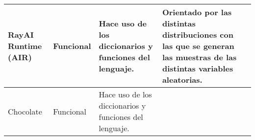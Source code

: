 \begin{longtable}{  p{2.15cm}  p{2.4cm}  p{4.75cm}  p{4.65cm}  p{5.45cm} }
    RayAI Runtime (AIR)                                                                                                                                                                                                                                                                                                          &
    Funcional                                                                                                                                                                                                                                                                                                                    &
    Hace uso de los diccionarios y funciones del lenguaje.                                                                                                                                                                                                                                                                        &
    Orientado por las distintas distribuciones con las que se generan las muestras de las distintas variables aleatorias.                                                                                                                                                                                                         &
    \\
    \hline
    Chocolate                                                                                                                                                                                                                                                                                                                    &
    Funcional                                                                                                                                                                                                                                                                                                                    &
    Hace uso de los diccionarios y funciones del lenguaje.                                                                                                                                                                                                                                                                        &

\end{longtable}
